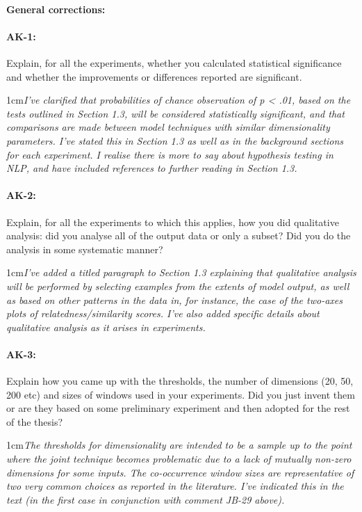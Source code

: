 \documentclass[11pt,a4paper]{article}
\newcommand{\res}[1]{\vspace{0.25cm} \begin{adjustwidth}{1cm}{}\emph{#1}\end{adjustwidth}}
\begin{document}
\paragraph{General corrections:}

\paragraph{AK-1:} Explain, for all the experiments, whether you calculated statistical significance and whether the improvements or differences reported are significant.

\res{I've clarified that probabilities of chance observation of p < .01, based on the tests outlined in Section 1.3, will be considered statistically significant, and that comparisons are made between model techniques with similar dimensionality parameters.  I've stated this in Section 1.3 as well as in the background sections for each experiment.  I realise there is more to say about hypothesis testing in NLP, and have included references to further reading in Section 1.3.}

\paragraph{AK-2:} Explain, for all the experiments to which this applies, how you did qualitative analysis: did you analyse all of the output data or only a subset? Did you do the analysis in some systematic manner?

\res{I've added a titled paragraph to Section 1.3 explaining that qualitative analysis will be performed by selecting examples from the extents of model output, as well as based on other patterns in the data in, for instance, the case of the two-axes plots of relatedness/similarity scores.  I've also added specific details about qualitative analysis as it arises in experiments.}

\paragraph{AK-3:} Explain how you came up with the thresholds, the number of dimensions (20, 50, 200 etc) and sizes of windows used in your experiments. Did you just invent them or are they based on some preliminary experiment and then adopted for the rest of the thesis?

\res{The thresholds for dimensionality are intended to be a sample up to the point where the joint technique becomes problematic due to a lack of mutually non-zero dimensions for some inputs.  The co-occurrence window sizes are representative of two very common choices as reported in the literature.  I've indicated this in the text (in the first case in conjunction with comment JB-29 above).}
\end{document}
